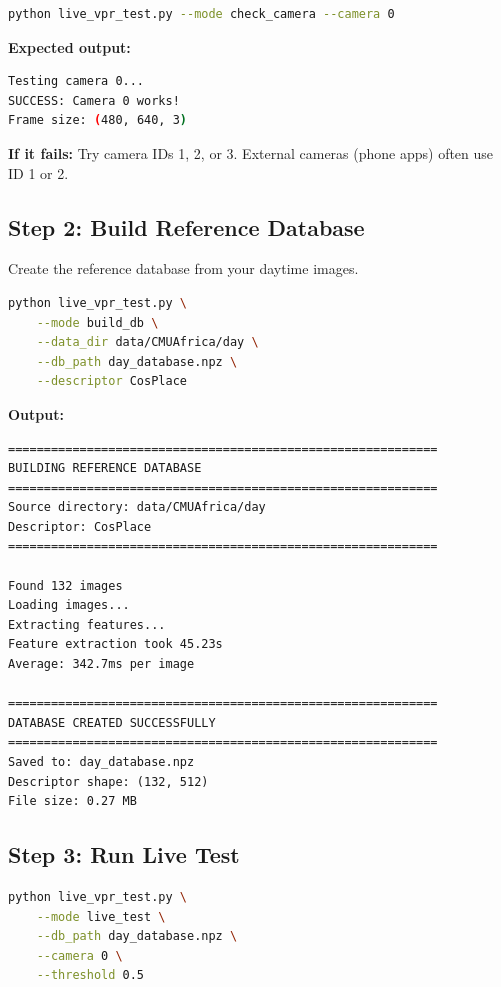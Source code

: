 \documentclass[11pt,a4paper]{article}
\begin{document}
\begin{lstlisting}[language=bash, caption=Camera verification command]
python live_vpr_test.py --mode check_camera --camera 0
\end{lstlisting}

\textbf{Expected output:}
\begin{lstlisting}[language=bash]
Testing camera 0...
SUCCESS: Camera 0 works!
Frame size: (480, 640, 3)
\end{lstlisting}

\textbf{If it fails:} Try camera IDs 1, 2, or 3. External cameras (phone apps) often use ID 1 or 2.

\subsection{Step 2: Build Reference Database}

Create the reference database from your daytime images.

\begin{lstlisting}[language=bash, caption=Building the reference database]
python live_vpr_test.py \
    --mode build_db \
    --data_dir data/CMUAfrica/day \
    --db_path day_database.npz \
    --descriptor CosPlace
\end{lstlisting}

\textbf{Output:}
\begin{lstlisting}
============================================================
BUILDING REFERENCE DATABASE
============================================================
Source directory: data/CMUAfrica/day
Descriptor: CosPlace
============================================================

Found 132 images
Loading images...
Extracting features...
Feature extraction took 45.23s
Average: 342.7ms per image

============================================================
DATABASE CREATED SUCCESSFULLY
============================================================
Saved to: day_database.npz
Descriptor shape: (132, 512)
File size: 0.27 MB
\end{lstlisting}

\subsection{Step 3: Run Live Test}

\begin{lstlisting}[language=bash, caption=Starting the live VPR test]
python live_vpr_test.py \
    --mode live_test \
    --db_path day_database.npz \
    --camera 0 \
    --threshold 0.5
\end{lstlisting}
\end{document}
